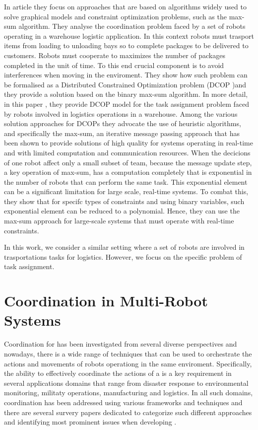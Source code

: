 In article \cite{maxsum} they focus on approaches that are based on algorithms
widely used to solve graphical models and constraint optimization problems, such as
the max-sum algorithm. They analyse the coordination problem faced by a set of robots
operating in a warehouse logistic application. In this context robots must trasport 
items from loading to unloading bays so to complete packages to be delivered to customers.
Robots must cooperate to maximizes the number of packages completed in the unit of time.
To this end crucial component is to avoid interferences when moving in the enviroment. 
They show how such problem can be formalised as a Distributed Constrained Optimization 
problem (DCOP )and they provide a solution based on the binary max-sum algorithm.
In more detail, in this paper \cite{maxsum}, they provide DCOP model for the task 
assignment problem faced by robots involved in logistics operations in a warehouse.
Among the various solution approaches for DCOPs they advocate the use of
heuristic algorithms, and specifically the max-sum, an iterative message passing
approach that has been shown to provide solutions of high quality for systems
operating in real-time and with limited computation and communication resources.
When the decicions of one robot affect only a small subset of team, because
the message update step, a key operation of max-sum, has a computation completely that 
is exponential in the number of robots that can perform the same task. 
This exponential element can be a significant limitation for large scale, real-time systems.
To combat this, they show that for specifc types of constraints and using binary variables,
such exponential element can be reduced to a polynomial. Hence, they can use the max-sum 
approach for large-scale systems that must operate with real-time constraints.


In this work, we consider a similar setting where a set of robots are involved
in trasportations tasks for logistics. However, we focus on the specific problem
of task assignment.

\section{Coordination in Multi-Robot Systems}
Coordination for \mrs has been investigated from several diverse
perspectives and nowadays, there is a wide range of techniques that can be used to 
orchestrate the actions and movements of robots operationg in the same enviroment.
Specifically, the ability to effectively coordinate the actions of a \mrs is a key 
requirement in several applications domains that range from disaster response to 
environmental monitoring, militaty operations, manufacturing and logistics. 
In all such domains, coordination has been addressed using various frameworks and 
techniques and there are several survery papers dedicated to categorize such different
approaches and identifying most prominent issues when developing \mrs.

